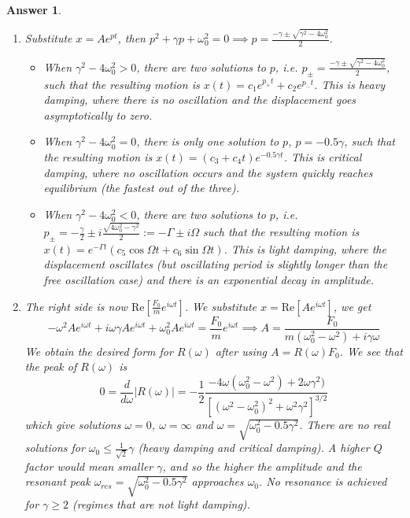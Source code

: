 \documentclass[a4paper]{article}
\newtheorem{ans}{Answer}[subsection]
\theoremstyle{new}
\begin{document}
\newpage
\begin{ans}\leavevmode
\begin{enumerate}[label=(\alph*)]
\item Substitute $x=Ae^{p t}$, then $p^2+\gamma p+\omega_0^2=0\implies p=\frac{-\gamma\pm\sqrt{\gamma^2-4\omega_0^2}}{2}$. 
\begin{itemize}
    \item When $\gamma^2-4\omega_0^2>0$, there are two solutions to $p$, i.e. $p_\pm=\frac{-\gamma\pm\sqrt{\gamma^2-4\omega_0^2}}{2}$, such that the resulting motion is $x(t)=c_1e^{p_+t}+c_2e^{p_-t}$. This is heavy damping, where there is no oscillation and the displacement goes asymptotically to zero. 
    \item When $\gamma^2-4\omega_0^2=0$, there is only one solution to $p$, $p=-0.5\gamma$, such that the resulting motion is $x(t)=(c_3+c_4t)e^{-0.5\gamma t}$. This is critical damping, where no oscillation occurs and the system quickly reaches equilibrium (the fastest out of the three). 
    \item When $\gamma^2-4\omega_0^2<0$, there are two solutions to $p$, i.e. $p_\pm=-\frac{\gamma}{2}\pm i\frac{\sqrt{4\omega_0^2-\gamma^2}}{2}:=-\Gamma\pm i\Omega$ such that the resulting motion is $x(t)=e^{-\Gamma t}(c_5\cos\Omega t+c_6\sin\Omega t)$. This is light damping, where the displacement oscillates (but oscillating period is slightly longer than the free oscillation case) and there is an exponential decay in amplitude.
\end{itemize}
\item The right side is now $\text{Re}[\frac{F_0}{m}e^{i\omega t}]$. We substitute $x=\text{Re}[Ae^{i\omega t}]$, we get
$$-\omega^2Ae^{i\omega t}+i\omega\gamma Ae^{i\omega t}+\omega_0^2Ae^{i\omega t}=\frac{F_0}{m}e^{i\omega t}\implies A=\frac{F_0}{m(\omega_0^2-\omega^2)+i\gamma\omega}$$
We obtain the desired form for $R(\omega)$ after using $A=R(\omega)F_0$. We see that the peak of $R(\omega)$ is
$$0=\frac{d}{d\omega}|R(\omega)|=-\frac{1}{2}\frac{-4\omega(\omega_0^2-\omega^2)+2\omega\gamma^2)}{[(\omega^2-\omega_0^2)^2+\omega^2\gamma^2]^{3/2}}$$
which give solutions $\omega=0$, $\omega=\infty$ and $\omega=\sqrt{\omega_0^2-0.5\gamma^2}$. There are no real solutions for $\omega_0\leq\frac{1}{\sqrt{2}}\gamma$ (heavy damping and critical damping). A higher $Q$ factor would mean smaller $\gamma$, and so the higher the amplitude and the resonant peak $\omega_{res}=\sqrt{\omega_0^2-0.5\gamma^2}$ approaches $\omega_0$. No resonance is achieved for $\gamma\geq2$ (regimes that are not light damping).\\[5pt]

\end{enumerate}
\end{ans}
\end{document}
